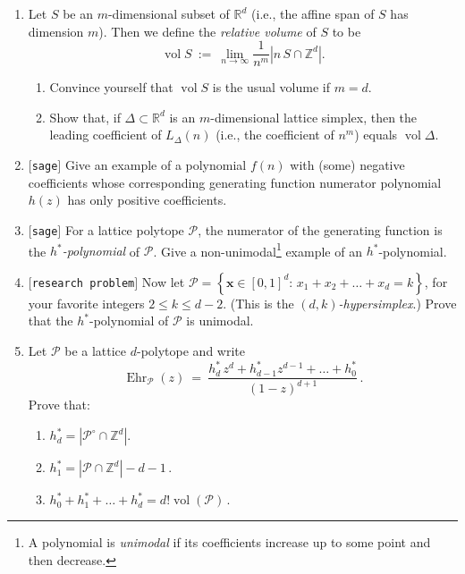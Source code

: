 \documentclass[11pt]{article}
\def\bx{\mathbf{x}}
\def\cP{\mathcal{P}}
\def\RR{\mathbb{R}}
\def\ZZ{\mathbb{Z}}
\newcommand\Ehr{\operatorname{Ehr}}
\newcommand\vol{\operatorname{vol}}
\def\open{$[${\tt research problem}$]$ }
\def\sage{$[${\tt sage}$]$ }
\begin{document}
\begin{enumerate}[(1)]
\item Let $S$ be an $m$-dimensional subset of $\RR^d$ (i.e., the affine span of $S$ has dimension $m$).
Then we define the \emph{relative volume} of $S$ to be
\[ \vol S \ := \ \lim_{ n \to \infty } \frac{ 1 }{ n^m } \left| n \, S \cap \ZZ^d \right| . \]
\begin{enumerate}[{\rm (a)}]
\item Convince yourself that $\vol S$ is the usual volume if $m = d$.
\item Show that, if $\Delta \subset \RR^d$ is an $m$-dimensional lattice
    simplex, then the leading coefficient of $L_\Delta(n)$
(i.e., the coefficient of $n^m$) equals $\vol \Delta$.
\end{enumerate}

\item \sage Give an example of a polynomial $f(n)$ with (some) negative coefficients whose corresponding generating function
numerator polynomial $h(z)$ has only positive coefficients.

\item \sage For a lattice polytope $\cP$, the numerator of the generating function is the \emph{$h^*$-polynomial} of $\cP$.
Give a non-unimodal\footnote{
A polynomial is \emph{unimodal} if its coefficients increase up to some point and
then decrease.
} example of an $h^*$-polynomial.

\item \open
Now let
$\cP = \left\{ \bx \in [0,1]^d : \, x_1 + x_2 + \dots + x_d = k \right\}$,
for your favorite integers $2 \le k \le d-2$. 
(This is the \emph{$(d, k)$-hypersimplex}.)
Prove that the $h^*$-polynomial of $\cP$ is unimodal.

\def\hs{h^*}

\item Let $\cP$ be a lattice $d$-polytope and write 
\[
    \Ehr_\cP (z) \ = \ \frac{ \hs_d \, z^d + \hs_{ d-1 } z^{ d-1 } + \dots +
    \hs_0 }{ (1-z)^{ d+1 } } \, .
\]
Prove that:
\begin{enumerate}[{\rm (a)}]
\item $\hs_d = \left| \cP^\circ \cap \ZZ^d \right| .$
\item $\hs_1 = \left| \cP \cap \ZZ^d \right| - d - 1 \, .$
\item $\hs_0 + \hs_1 + \dots + \hs_d = d! \vol(\cP) \, .$
\end{enumerate}


\end{enumerate}
\end{document}
